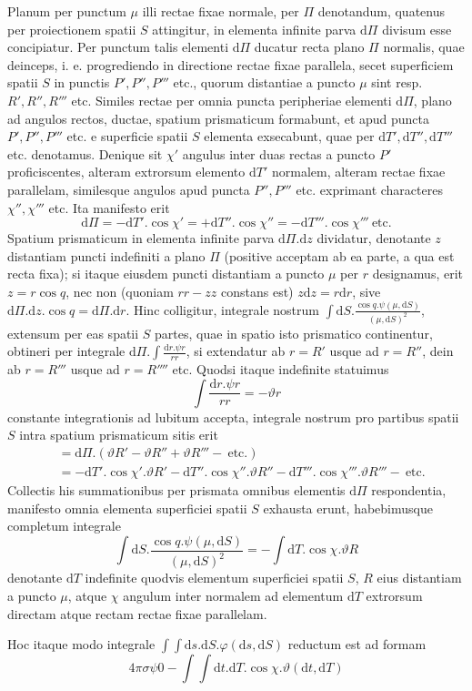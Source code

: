 Planum per punctum $\mu$ illi rectae fixae normale, per $\Pi$ denotandum, quatenus per proiectionem spatii $S$ attingitur, in elementa infinite parva $\mathrm{d}\Pi$ divisum esse concipiatur. Per punctum talis elementi $\mathrm{d}\Pi$ ducatur recta plano $\Pi$ normalis, quae deinceps, i. e. progrediendo in directione rectae fixae parallela, secet superficiem spatii $S$ in punctis $P',P'',P'''$ etc., quorum distantiae a puncto $\mu$ sint resp. $R',R'',R'''$ etc. Similes rectae per omnia puncta peripheriae elementi $\mathrm{d}\Pi$, plano ad angulos rectos, ductae, spatium prismaticum formabunt, et apud puncta $P',P'',P'''$ etc. e superficie spatii $S$ elementa exsecabunt, quae per $\mathrm{d}T',\mathrm{d}T'',\mathrm{d}T'''$ etc. denotamus. Denique sit $\chi'$ angulus inter duas rectas a puncto $P'$ proficiscentes, alteram extrorsum elemento $\mathrm{d}T'$ normalem, alteram rectae fixae parallelam, similesque angulos apud puncta $P'',P'''$ etc. exprimant characteres $\chi'',\chi'''$ etc. Ita manifesto erit
\[
\mathrm{d}\Pi=-\mathrm{d}T'.\cos\chi'=+\mathrm{d}T''.\cos\chi''=-\mathrm{d}T'''.\cos\chi'''\ \text{etc.}
\]
Spatium prismaticum in elementa infinite parva $\mathrm{d}\Pi.\mathrm{d}z$ dividatur, denotante $z$ distantiam puncti indefiniti a plano $\Pi$ (positive acceptam ab ea parte, a qua est recta fixa); si itaque eiusdem puncti distantiam a puncto $\mu$ per $r$ designamus, erit $z=r\cos q$, nec non (quoniam $rr-zz$ constans est) $z\mathrm{d}z=r\mathrm{d}r$, sive $\mathrm{d}\Pi.\mathrm{d}z.\cos q=\mathrm{d}\Pi.\mathrm{d}r$. Hinc colligitur, integrale nostrum $\int\mathrm{d}S.\frac{\cos q.\psi(\mu,\mathrm{d}S)}{(\mu,\mathrm{d}S)^2}$, extensum per eas spatii $S$ partes, quae in spatio isto prismatico continentur, obtineri per integrale $\mathrm{d}\Pi.\int\frac{\mathrm{d}r.\psi r}{rr}$, si extendatur ab $r=R'$ usque ad $r=R''$, dein ab $r=R'''$ usque ad $r=R''''$ etc. Quodsi itaque indefinite statuimus
\[
\int\frac{\mathrm{d}r.\psi r}{rr}=-\vartheta r
\]
constante integrationis ad lubitum accepta, integrale nostrum pro partibus spatii $S$ intra spatium prismaticum sitis erit
\[
\begin{aligned}
&=\mathrm{d}\Pi.(\vartheta R'-\vartheta R''+\vartheta R'''-\ \text{etc.})\\
&=-\mathrm{d}T'.\cos\chi'.\vartheta R'-\mathrm{d}T''.\cos\chi''.\vartheta R''-\mathrm{d}T'''.\cos\chi'''.\vartheta R'''-\ \text{etc.}
\end{aligned}
\]
Collectis his summationibus per prismata omnibus elementis $\mathrm{d}\Pi$ respondentia, manifesto omnia elementa superficiei spatii $S$ exhausta erunt, habebimusque completum integrale
\[
\int\mathrm{d}S.\frac{\cos q.\psi(\mu,\mathrm{d}S)}{(\mu,\mathrm{d}S)^2}=-\int\mathrm{d}T.\cos\chi.\vartheta R
\]
denotante $\mathrm{d}T$ indefinite quodvis elementum superficiei spatii $S$, $R$ eius distantiam a puncto $\mu$, atque $\chi$ angulum inter normalem ad elementum $\mathrm{d}T$ extrorsum directam atque rectam rectae fixae parallelam.

Hoc itaque modo integrale $\int\int\mathrm{d}s.\mathrm{d}S.\varphi(\mathrm{d}s,\mathrm{d}S)$ reductum est ad formam
\[
4\pi\sigma\psi0-\int\int\mathrm{d}t.\mathrm{d}T.\cos\chi.\vartheta(\mathrm{d}t,\mathrm{d}T)
\]
